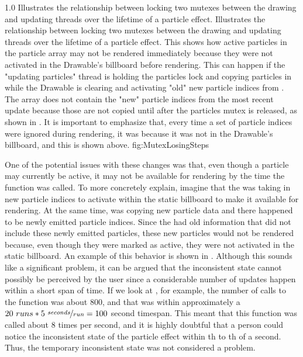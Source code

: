 
{1.0}
{Illustrates the relationship between locking two mutexes between the drawing and updating threads over the lifetime of a particle effect.}
{Illustrates the relationship between locking two mutexes between the drawing and updating threads over the lifetime of a particle effect. This shows how active particles in the particle array may not be rendered immediately because they were not activated in the Drawable's billboard before rendering. This can happen if the "updating particles" thread is holding the particles lock and copying particles in  while the Drawable is clearing and activating "old" new particle indices from . The array does not contain the "new" particle indices from the most recent update because those are not copied until after the particles mutex is released, as shown in . It is important to emphasize that, every time a set of particle indices were ignored during rendering, it was because it was not in the Drawable's billboard, and this is shown above.}
{fig:MutexLosingSteps}

One of the potential issues with these changes was that, even though a particle may currently be active, it may not be available for rendering by the time the  function was called. To more concretely explain, imagine that the  was taking in new particle indices to activate within the static billboard to make it available for rendering. At the same time,  was copying new particle data and there happened to be newly emitted particle indices. Since the  had old information that did not include these newly emitted particles, these new particles would not be rendered because, even though they were marked as active, they were not activated in the static billboard. An example of this behavior is shown in . Although this sounds like a significant problem, it can be argued that the inconsistent state cannot possibly be perceived by the user since a considerable number of updates happen within a short span of time. If we look at , for example, the number of calls to the  function was about 800, and that was within approximately a $ 20 \ runs * 5 \ \nicefrac[]{seconds}{run} = 100 $ second timespan. This meant that this function was called about 8 times per second, and it is highly doubtful that a person could notice the inconsistent state of the particle effect within th to th of a second. Thus, the temporary inconsistent state was not considered a problem.


